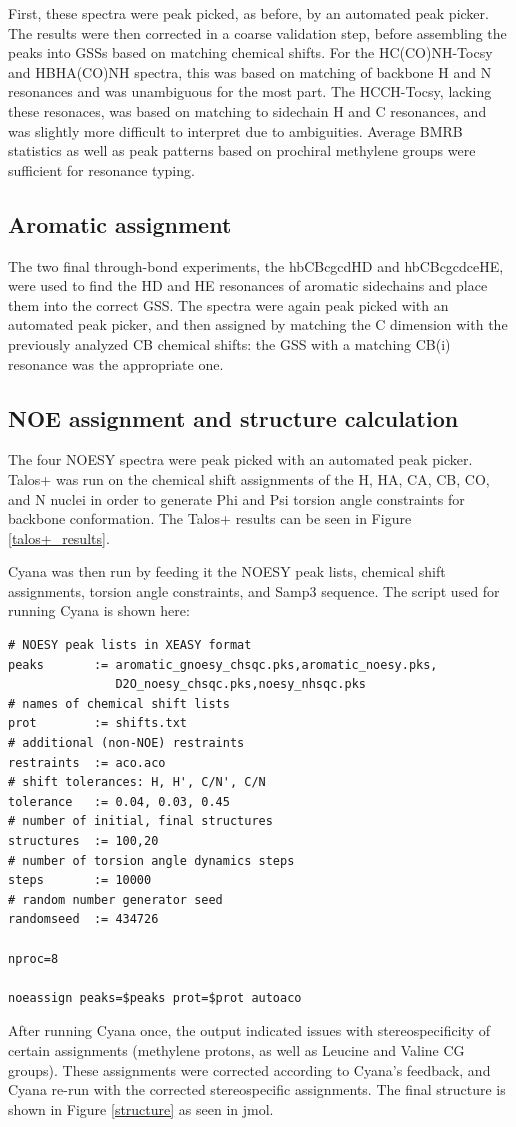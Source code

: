First, these spectra were peak picked, as before, by an automated peak picker.
The results were then corrected in a coarse validation step, before assembling
the peaks into GSSs based on matching chemical shifts.  For the HC(CO)NH-Tocsy
and HBHA(CO)NH spectra, this was based on matching of backbone H and N
resonances and was unambiguous for the most part.  The HCCH-Tocsy, lacking these
resonaces, was based on matching to sidechain H and C resonances, and was
slightly more difficult to interpret due to ambiguities.  
Average BMRB statistics as well as peak patterns based on prochiral methylene
groups were sufficient for resonance typing.

\subsection{Aromatic assignment}
The two final through-bond experiments, the hbCBcgcdHD and hbCBcgcdceHE, were
used to find the HD and HE resonances of aromatic sidechains and place them
into the correct GSS.  The spectra were again peak picked with an automated
peak picker, and then assigned by matching the C dimension with the previously
analyzed CB chemical shifts: the GSS with a matching CB(i) resonance was the
appropriate one.

\subsection{NOE assignment and structure calculation}
The four NOESY spectra were peak picked with an automated peak picker.  
Talos+ \cite{talos+} was run on the chemical shift assignments of the H, HA,
CA, CB, CO, and N nuclei in order to generate Phi and Psi torsion angle 
constraints for backbone conformation.
The Talos+ results can be seen in Figure \ref{talos+_results}.

Cyana was then run by feeding it the NOESY peak lists, chemical shift
assignments, torsion angle constraints, and Samp3 sequence.  The script
used for running Cyana is shown here:
\begin{verbatim}
# NOESY peak lists in XEASY format
peaks       := aromatic_gnoesy_chsqc.pks,aromatic_noesy.pks,
               D2O_noesy_chsqc.pks,noesy_nhsqc.pks
# names of chemical shift lists
prot        := shifts.txt                
# additional (non-NOE) restraints
restraints  := aco.aco                   
# shift tolerances: H, H', C/N', C/N
tolerance   := 0.04, 0.03, 0.45          
# number of initial, final structures
structures  := 100,20                    
# number of torsion angle dynamics steps
steps       := 10000                    
# random number generator seed
randomseed  := 434726                    

nproc=8

noeassign peaks=$peaks prot=$prot autoaco
\end{verbatim}
After running Cyana once, the output indicated issues with stereospecificity
of certain assignments (methylene protons, as well as Leucine and Valine
CG groups).  These assignments were corrected according to Cyana's feedback,
and Cyana re-run with the corrected stereospecific assignments.
The final structure is shown in Figure \ref{structure} as seen in jmol.


